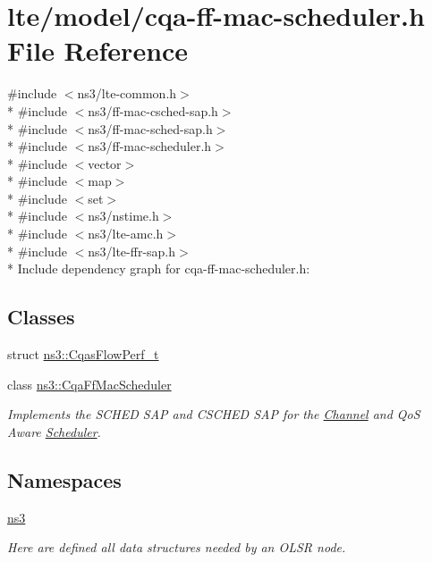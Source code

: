 \hypertarget{cqa-ff-mac-scheduler_8h}{}\section{lte/model/cqa-\/ff-\/mac-\/scheduler.h File Reference}
\label{cqa-ff-mac-scheduler_8h}
{\ttfamily \#include $<$ns3/lte-\/common.\+h$>$}\\*
{\ttfamily \#include $<$ns3/ff-\/mac-\/csched-\/sap.\+h$>$}\\*
{\ttfamily \#include $<$ns3/ff-\/mac-\/sched-\/sap.\+h$>$}\\*
{\ttfamily \#include $<$ns3/ff-\/mac-\/scheduler.\+h$>$}\\*
{\ttfamily \#include $<$vector$>$}\\*
{\ttfamily \#include $<$map$>$}\\*
{\ttfamily \#include $<$set$>$}\\*
{\ttfamily \#include $<$ns3/nstime.\+h$>$}\\*
{\ttfamily \#include $<$ns3/lte-\/amc.\+h$>$}\\*
{\ttfamily \#include $<$ns3/lte-\/ffr-\/sap.\+h$>$}\\*
Include dependency graph for cqa-\/ff-\/mac-\/scheduler.h\+:
\subsection*{Classes}
\begin{DoxyCompactItemize}
\item 
struct \hyperlink{structns3_1_1CqasFlowPerf__t}{ns3\+::\+Cqas\+Flow\+Perf\+\_\+t}
\item 
class \hyperlink{classns3_1_1CqaFfMacScheduler}{ns3\+::\+Cqa\+Ff\+Mac\+Scheduler}
\begin{DoxyCompactList}\small\item\em Implements the S\+C\+H\+ED S\+AP and C\+S\+C\+H\+ED S\+AP for the \hyperlink{classns3_1_1Channel}{Channel} and QoS Aware \hyperlink{classns3_1_1Scheduler}{Scheduler}. \end{DoxyCompactList}\end{DoxyCompactItemize}
\subsection*{Namespaces}
\begin{DoxyCompactItemize}
\item 
 \hyperlink{namespacens3}{ns3}
\begin{DoxyCompactList}\small\item\em Here are defined all data structures needed by an O\+L\+SR node. \end{DoxyCompactList}\end{DoxyCompactItemize}

